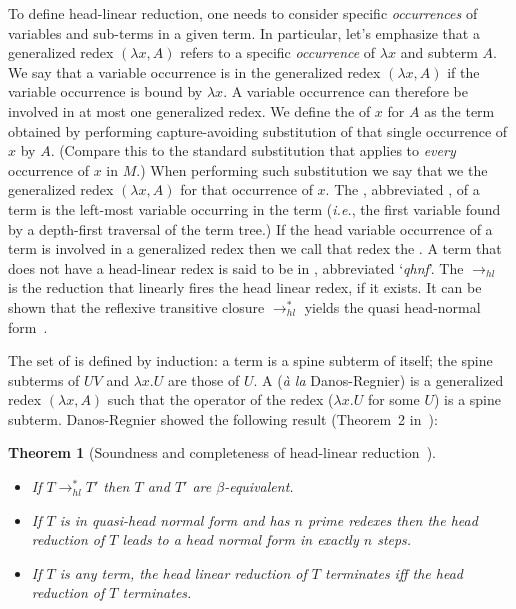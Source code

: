 \documentclass{elsarticle}
\makeatletter
\theoremstyle{plain}
\newtheorem{theorem}{Theorem}[section]
\theoremstyle{definition}
\renewcommand\ie{{\it i.e.\@\xspace}}
\newcommand{\hlred}{\rightarrow_{hl}}
\makeatother
\begin{document}
To define head-linear reduction, one needs to consider specific \emph{occurrences} of variables and sub-terms in a given term. In particular, let's emphasize that a generalized redex  $(\lambda x, A)$ refers to a specific \emph{occurrence} of $\lambda x$ and subterm $A$.
%
We say that a variable occurrence is  in the generalized redex $(\lambda x, A)$ if the variable occurrence is bound by $\lambda x$. A variable occurrence can therefore be involved in at most one generalized redex. We define the  of $x$ for $A$ as the term obtained by performing capture-avoiding substitution of that single occurrence of $x$ by $A$. (Compare this to the standard substitution that applies to \emph{every} occurrence of $x$ in $M$.) When performing such substitution we say that we  the generalized redex $(\lambda x, A)$ for that occurrence of $x$.
%
The , abbreviated , of a term is the left-most variable occurring in the term (\ie, the first variable found by a depth-first traversal of the term tree.) If the head variable occurrence of a term is involved in a generalized redex then we call that redex the .
A term that does not have a head-linear redex is said to be in , abbreviated `\emph{qhnf}'.
The  $\hlred$ is the reduction that linearly fires the head linear redex, if it exists. It can be shown that the reflexive transitive closure $\rightarrow^*_{hl}$ yields the quasi head-normal form~\cite{danos-head,danosherbelinregnier1996}.

The set of  is defined by induction: a term is a spine subterm of itself; the spine subterms of $U V$ and $\lambda x. U$ are those of $U$.
A  ({\it \`a la} Danos-Regnier) is a generalized redex $(\lambda x, A)$ such that the operator of the redex ($\lambda x . U$ for some $U$) is a spine subterm. Danos-Regnier showed the following result (Theorem~2 in~\cite{danos-head}):
\begin{theorem}[Soundness and completeness of head-linear reduction~\cite{danos-head}] \
\label{thm:danosregnier_headlinred}
\begin{itemize}[nosep]
\item If $T \rightarrow^*_{hl} T'$  then $T$ and $T'$ are $\beta$-equivalent.
\item If $T$ is in quasi-head normal form and has $n$ prime redexes then the head reduction of $T$ leads to a head normal form in exactly $n$ steps.
\item If $T$ is any term, the head linear reduction of $T$ terminates iff the head reduction of $T$ terminates.
\end{itemize}
\end{theorem}
\end{document}
